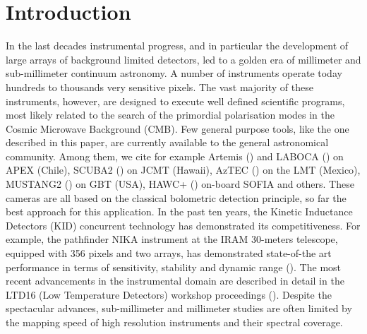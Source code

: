 \documentclass[]{aa} %
\begin{document}

   \maketitle
%

\section{Introduction}

In the last decades instrumental progress, and in particular the development of large arrays of background limited detectors, led to a golden era of millimeter and sub-millimeter continuum astronomy. A number of instruments operate today hundreds to thousands very sensitive pixels. The vast majority of these instruments, however, are designed to execute well defined scientific programs, most likely related to the search of the primordial polarisation modes in the Cosmic Microwave Background (CMB). Few general purpose tools, like the one described in this paper, are currently available to the general astronomical community. Among them, we cite for example Artemis (\cite{Reveret2014}) and LABOCA (\cite{Siringo2009}) on APEX (Chile), SCUBA2 (\cite{Holland2013}) on JCMT (Hawaii), AzTEC (\cite{Chavez-Dagostino2016}) on the LMT (Mexico), MUSTANG2 (\cite{Dicker2014}) on GBT (USA), HAWC+ (\cite{Staguhn2016}) on-board SOFIA and others. These cameras are all based on the classical bolometric detection principle, so far the best approach for this application. In the past ten years, the Kinetic Inductance Detectors (KID) concurrent technology has demonstrated its competitiveness. For example, the pathfinder NIKA instrument at the IRAM 30-meters telescope, equipped with 356 pixels and two arrays, has demonstrated state-of-the art performance in terms of sensitivity, stability and dynamic range (\cite{Catalano2014, Monfardini2011, Adam2014}). The most recent advancements in the instrumental domain are described in detail in the LTD16 (Low Temperature Detectors) workshop proceedings (\cite{ltd16:2016}). Despite the spectacular advances, sub-millimeter and millimeter studies are often limited by the mapping speed of high resolution instruments and their spectral coverage. 

\end{document}
